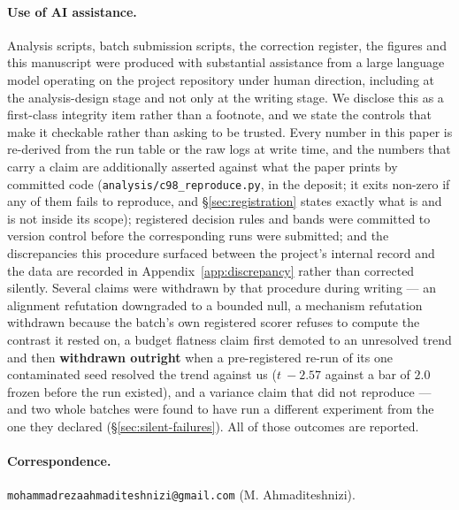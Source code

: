 \documentclass[10pt,letterpaper]{article}
\begin{document}
\paragraph{Use of AI assistance.}
Analysis scripts, batch submission scripts, the correction register, the figures and this manuscript
were
produced with substantial assistance from a large language model operating on the project repository
under human direction, including at the analysis-design stage and not only at the writing stage. We
disclose this as a first-class integrity item rather than a footnote, and we state the controls that
make it checkable rather than asking to be trusted. Every number in this paper is re-derived from
the run table or the raw logs at write time, and the numbers that carry a claim are additionally
asserted against what the paper prints by committed code
(\texttt{analysis/c98\_reproduce.py}, in the deposit; it exits non-zero if any of them fails
to reproduce, and \S\ref{sec:registration} states exactly what is and is not inside its scope); registered decision rules and bands were committed to version control before the
corresponding runs were submitted; and the discrepancies this procedure surfaced between the
project's internal record and the data are recorded in Appendix~\ref{app:discrepancy} rather than
corrected silently. Several claims were withdrawn by that procedure during writing --- an alignment
refutation downgraded to a bounded null, a mechanism refutation withdrawn because the batch's own
registered scorer refuses to compute the contrast it rested on, a budget flatness claim first
demoted to an unresolved trend and then \textbf{withdrawn outright} when a pre-registered re-run of
its one contaminated seed resolved the trend against us ($t\ -2.57$ against a bar of $2.0$ frozen
before the run existed), and a variance claim that did not reproduce --- and two whole batches were
found to have run a different experiment from the one they declared
(\S\ref{sec:silent-failures}). All of those outcomes are reported.

\paragraph{Correspondence.}
\texttt{mohammadrezaahmaditeshnizi@gmail.com} (M. Ahmaditeshnizi).


\end{document}
